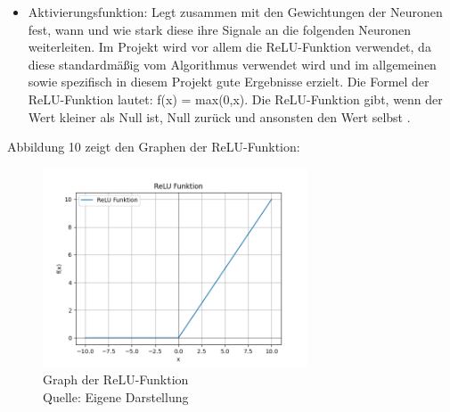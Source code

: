 \begin{itemize}
\item Aktivierungsfunktion: Legt zusammen mit den Gewichtungen der Neuronen fest, wann und wie stark diese ihre Signale an die folgenden Neuronen weiterleiten. Im Projekt wird vor allem die ReLU-Funktion verwendet, da diese standardmäßig vom Algorithmus verwendet wird und im allgemeinen sowie spezifisch in diesem Projekt gute Ergebnisse erzielt. Die Formel der ReLU-Funktion lautet: f(x) = max(0,x). Die ReLU-Funktion gibt, wenn der Wert kleiner als Null ist, Null zurück und ansonsten den Wert selbst \cite{schmidt-hieber_nonparametric_2020}.
\end{itemize} 

Abbildung 10 zeigt den Graphen der ReLU-Funktion:
\nopagebreak
\begin{figure}[H]
	\centering
	\includegraphics[width=0.7\textwidth]{Bilder/ReLU} 
	\caption[Graph der ReLU-Funktion]{Graph der ReLU-Funktion\\ Quelle: Eigene Darstellung}
\end{figure}

